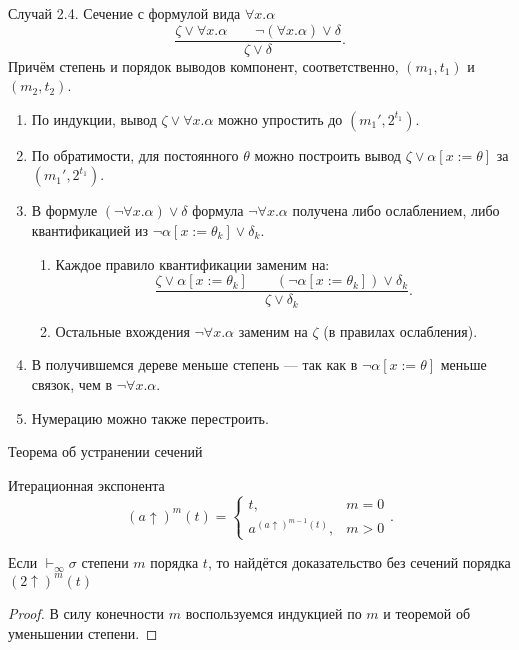 {Случай 2.4. Сечение с формулой вида $\forall x.\alpha$}
\[ \dfrac{\zeta\vee\forall x.\alpha\quad\quad\neg(\forall x.\alpha)\vee\delta}{\zeta\vee\delta}.\]
Причём степень и порядок выводов компонент, соответственно, $(m_1,t_1)$ и $(m_2,t_2)$.
\begin{enumerate}
\item По индукции, вывод $\zeta\vee\forall x.\alpha$ можно упростить до $(m_1',2^{t_1})$.
\item По обратимости, для постоянного $\theta$ можно построить вывод $\zeta\vee\alpha[x := \theta]$ за $(m_1',2^{t_1})$.
\item В формуле $(\neg \forall x. \alpha)\vee\delta$ формула $\neg\forall x.\alpha$ получена
либо ослаблением, либо квантификацией из $\neg\alpha[x := \theta_k]\vee\delta_k$.
\begin{enumerate}
\item Каждое правило квантификации заменим на:
\[ \dfrac{\zeta\vee\alpha[x := \theta_k]\quad\quad(\neg\alpha[x := \theta_k])\vee\delta_k}{\zeta\vee\delta_k}.\]
\item Остальные вхождения $\neg\forall x.\alpha$ заменим на $\zeta$ (в правилах ослабления).
\end{enumerate}
\item В получившемся дереве меньше степень --- так как в $\neg\alpha[x := \theta]$ меньше связок, чем в $\neg\forall x.\alpha$.
\item Нумерацию можно также перестроить.
\end{enumerate}


{Теорема об устранении сечений}
\begin{definition}Итерационная экспонента
\[ (a\uparrow)^m(t) =
  \left\{
    \begin{array}{ll}     t,&m=0\\
 a^{(a\uparrow)^{m-1}(t)},&m > 0
    \end{array}
  \right. .\]
\end{definition}
\begin{theorem}Если $\vdash_\infty\sigma$ степени $m$ порядка $t$, то найдётся доказательство без сечений
порядка $(2\uparrow)^m(t)$
\end{theorem}
\begin{proof}
В силу конечности $m$ воспользуемся индукцией по $m$ и теоремой об уменьшении степени.
\end{proof}


